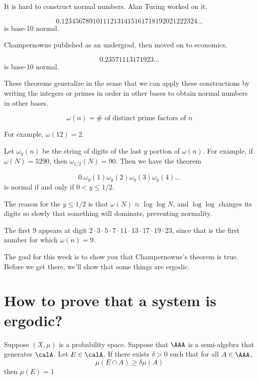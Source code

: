 \documentclass{article}
\begin{document}
It is hard to construct normal numbers. Alan Turing worked on it.
\begin{theorem}[Champernowne, 1922]
    \[ 0.123456789101112131415161718192021222324\ldots \]
    is base-10 normal.
\end{theorem}
Champernowne published as an undergrad, then moved on to economics.

\begin{theorem}
    \[0.23571113171923\ldots \]
    is base-10 normal.
\end{theorem}

These theorems generalize in the sense that we can apply these 
constructions by writing the integers or primes in order 
in other bases to obtain normal numbers in other bases.

\begin{definition}
\[ \omega(n)=\#\text{ of distinct prime factors of $n$}\]
\end{definition}

For example, $\omega(12)=2$.

Let $\omega_y(n)$ be the string of digits of the last $y$
portion of $\omega(n)$.
For example, if $\omega(N) = 5290$, then $\omega_{1/2}(N) = 90$.
Then we have the theorem
\begin{theorem}[Vandehey]
    \[0.\omega_y(1)\omega_y(2)\omega_y(3)\omega_y(4)\ldots \]
    is normal if and only if $0<y\le 1/2$.
\end{theorem}

The reason for the $y \le 1/2$ is that $\omega(N)\approx \log\log N$,
and $\log\log$ changes its digits so slowly that something 
will dominate, preventing normality.

The first $9$ appears at digit $2\cdot 3 \cdot 5\cdot 7 \cdot 11 
\cdot 13\cdot 17\cdot 19 \cdot 23$, since that is 
the first number for which $\omega(n) = 9$.

The goal for this week is to show you that Champernowne's theorem 
is true. Before we get there, we'll show that some things are 
ergodic.

\section{How to prove that a system is ergodic?}

\begin{lemma}
    Suppose $(X,\mu)$ is a probability space. Suppose that 
    $\AAA$ is a semi-algebra that generates $\calA$. 
    Let $E\in \calA$. If there 
    exists $\delta > 0$ such that for all $A\in\AAA$,
    \[\mu(E\cap A) \ge \delta \mu(A)\]
    then $\mu(E)=1$
\end{lemma}
\end{document}
